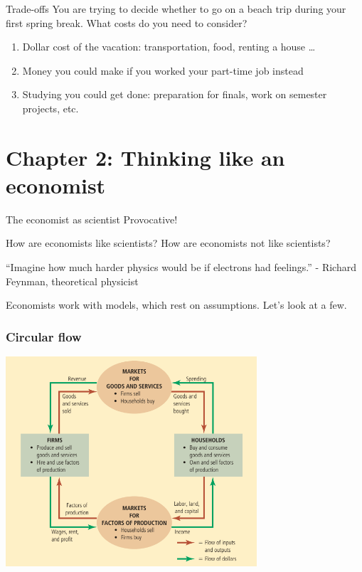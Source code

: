\documentclass{beamer}
\begin{document}
\begin{frame}{Trade-offs}
    You are trying to decide whether to go on a beach trip during your first spring break. What costs do you need to consider? 
    \begin{enumerate}
        \item Dollar cost of the vacation: transportation, food, renting a house \dots
        \item Money you could make if you worked your part-time job instead
        \item Studying you could get done: preparation for finals, work on semester projects, etc.
    \end{enumerate}
\end{frame}

\section{Chapter 2: Thinking like an economist}

\begin{frame}{The economist as scientist}
    Provocative! 

    \medskip

    How are economists like scientists? 
    How are economists not like scientists?

    \medskip

    \begin{block}{“Imagine how much harder physics would be if electrons had feelings.”}
        - Richard Feynman, theoretical physicist
    \end{block}

    \medskip

    Economists work with models, which rest on assumptions. Let's look at a few.
\end{frame}

\begin{frame}
    \frametitle{Circular flow}
    \centering
    \includegraphics[width = 0.7\textwidth,keepaspectratio]{model1.png}
\end{frame}
\end{document}
